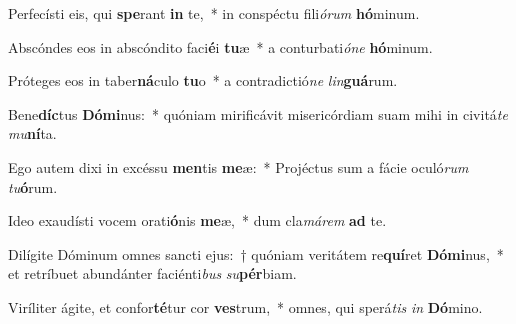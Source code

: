 \item Perfecísti eis, qui \textbf{spe}rant \textbf{in} te,~* in conspéctu fili\textit{ó}\textit{rum} \textbf{hó}minum.
\item Abscóndes eos in abscóndito faci\textbf{é}i \textbf{tu}æ~* a conturbati\textit{ó}\textit{ne} \textbf{hó}minum.
\item Próteges eos in taber\textbf{ná}culo \textbf{tu}o~* a contradictió\textit{ne} \textit{lin}\textbf{guá}rum.
\item Bene\textbf{díc}tus \textbf{Dó}\textbf{mi}nus:~* quóniam mirificávit misericórdiam suam mihi in civitá\textit{te} \textit{mu}\textbf{ní}ta.
\item Ego autem dixi in excéssu \textbf{men}tis \textbf{me}æ:~* Projéctus sum a fácie oculó\textit{rum} \textit{tu}\textbf{ó}rum.
\item Ideo exaudísti vocem orati\textbf{ó}nis \textbf{me}æ,~* dum cla\textit{má}\textit{rem} \textbf{ad} te.
\item Dilígite Dóminum omnes sancti ejus:~† quóniam veritátem re\textbf{quí}ret \textbf{Dó}\textbf{mi}nus,~* et retríbuet abundánter faciénti\textit{bus} \textit{su}\textbf{pér}biam.
\item Viríliter ágite, et confor\textbf{té}tur cor \textbf{ves}trum,~* omnes, qui sperá\textit{tis} \textit{in} \textbf{Dó}mino.

